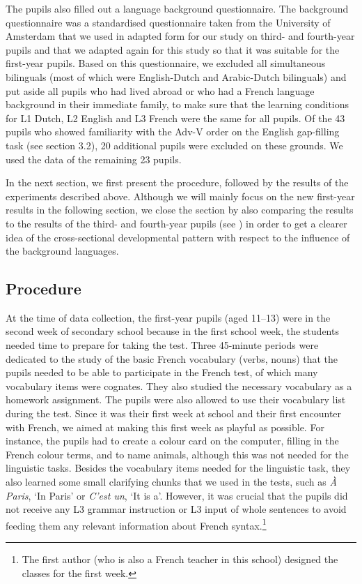 \documentclass[output=paper]{langsci/langscibook}
\begin{document}
The pupils also filled out a language background questionnaire. The background questionnaire was a standardised questionnaire taken from the University of Amsterdam that we used in adapted form for our study on third- and fourth-year pupils and that we adapted again for this study so that it was suitable for the first-year pupils. Based on this questionnaire, we excluded all simultaneous bilinguals (most of which were English-Dutch and Arabic-Dutch bilinguals) and put aside all pupils who had lived abroad or who had a French language background in their immediate family, to make sure that the learning conditions for L1 Dutch, L2 English and L3 French were the same for all pupils. Of the 43 pupils who showed familiarity with the Adv-V order on the English gap-filling task (see section 3.2), 20 additional pupils were excluded on these grounds. We used the data of the remaining 23 pupils.

  In the next section, we first present the procedure, followed by the results of the experiments described above. Although we will mainly focus on the new first-year results in the following section, we close the section by also comparing the results to the results of the third- and fourth-year pupils (see ) in order to get a clearer idea of the cross-sectional developmental pattern with respect to the influence of the background languages.

\subsection{Procedure}
\label{sec:stadt:3.4}

At the time of data collection, the first-year pupils (aged 11–13) were in the second week of secondary school because in the first school week, the students needed time to prepare for taking the test. Three 45-minute periods were dedicated to the study of the basic French vocabulary (verbs, nouns) that the pupils needed to be able to participate in the French test, of which many vocabulary items were cognates. They also studied the necessary vocabulary as a homework assignment. The pupils were also allowed to use their vocabulary list during the test. Since it was their first week at school and their first encounter with French, we aimed at making this first week as playful as possible. For instance, the pupils had to create a colour card on the computer, filling in the French colour terms, and to name animals, although this was not needed for the linguistic tasks. Besides the vocabulary items needed for the linguistic task, they also learned some small clarifying chunks that we used in the tests, such as \textit{À Paris}, ‘In Paris’ or \textit{C’est un}, ‘It is a’. However, it was crucial that the pupils did not receive any L3 grammar instruction or L3 input of whole sentences to avoid feeding them any relevant information about French syntax.\footnote{The first author (who is also a French teacher in this school) designed the classes for the first week.}
\end{document}
